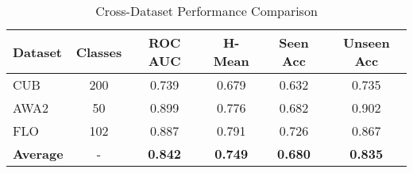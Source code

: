 
\begin{table}[htbp]
\centering
\caption{Cross-Dataset Performance Comparison}
\label{tab:cross_dataset}
\begin{tabular}{|l|c|c|c|c|c|}
\hline
\textbf{Dataset} & \textbf{Classes} & \textbf{ROC AUC} & \textbf{H-Mean} & \textbf{Seen Acc} & \textbf{Unseen Acc} \\
\hline
CUB & 200 & 0.739 & 0.679 & 0.632 & 0.735 \\
AWA2 & 50 & 0.899 & 0.776 & 0.682 & 0.902 \\
FLO & 102 & 0.887 & 0.791 & 0.726 & 0.867 \\
\hline
\textbf{Average} & - & \textbf{0.842} & \textbf{0.749} & \textbf{0.680} & \textbf{0.835} \\
\hline
\end{tabular}
\end{table}

